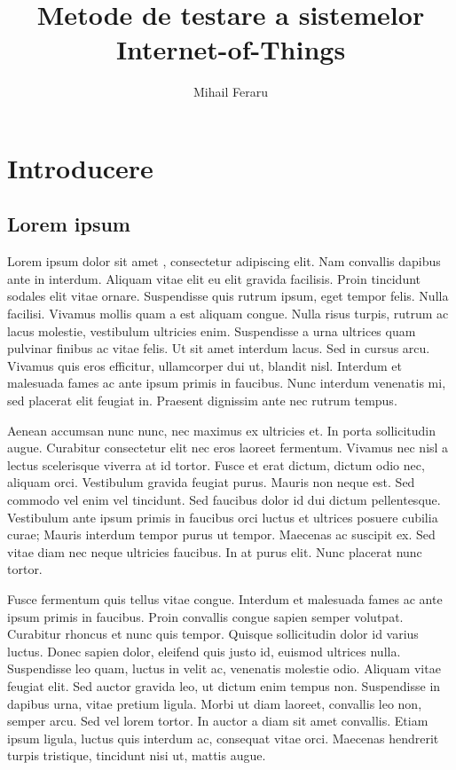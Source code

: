 \documentclass{report}[12pt, a4paper]
\title{Metode de testare a sistemelor Internet-of-Things}
\author{Mihail Feraru}
\begin{document}
\cleardoublepage
\pagestyle{front}
\let\ps@plain\ps@front



\restoregeometry

\addtocounter{page}{1}



\tableofcontents

\cleardoublepage
\pagestyle{main}
\let\ps@plain\ps@main

\chapter{Introducere}

\section{Lorem ipsum}

Lorem ipsum dolor sit amet \cite{fake_citation}, consectetur adipiscing elit. Nam convallis dapibus ante in interdum. Aliquam vitae elit eu elit gravida facilisis. Proin tincidunt sodales elit vitae ornare. Suspendisse quis rutrum ipsum, eget tempor felis. Nulla facilisi. Vivamus mollis quam a est aliquam congue. Nulla risus turpis, rutrum ac lacus molestie, vestibulum ultricies enim. Suspendisse a urna ultrices quam pulvinar finibus ac vitae felis. Ut sit amet interdum lacus. Sed in cursus arcu. Vivamus quis eros efficitur, ullamcorper dui ut, blandit nisl. Interdum et malesuada fames ac ante ipsum primis in faucibus. Nunc interdum venenatis mi, sed placerat elit feugiat in. Praesent dignissim ante nec rutrum tempus.

Aenean accumsan nunc nunc, nec maximus ex ultricies et. In porta sollicitudin augue. Curabitur consectetur elit nec eros laoreet fermentum. Vivamus nec nisl a lectus scelerisque viverra at id tortor. Fusce et erat dictum, dictum odio nec, aliquam orci. Vestibulum gravida feugiat purus. Mauris non neque est. Sed commodo vel enim vel tincidunt. Sed faucibus dolor id dui dictum pellentesque. Vestibulum ante ipsum primis in faucibus orci luctus et ultrices posuere cubilia curae; Mauris interdum tempor purus ut tempor. Maecenas ac suscipit ex. Sed vitae diam nec neque ultricies faucibus. In at purus elit. Nunc placerat nunc tortor.

Fusce fermentum quis tellus vitae congue. Interdum et malesuada fames ac ante ipsum primis in faucibus. Proin convallis congue sapien semper volutpat. Curabitur rhoncus et nunc quis tempor. Quisque sollicitudin dolor id varius luctus. Donec sapien dolor, eleifend quis justo id, euismod ultrices nulla. Suspendisse leo quam, luctus in velit ac, venenatis molestie odio. Aliquam vitae feugiat elit. Sed auctor gravida leo, ut dictum enim tempus non. Suspendisse in dapibus urna, vitae pretium ligula. Morbi ut diam laoreet, convallis leo non, semper arcu. Sed vel lorem tortor. In auctor a diam sit amet convallis. Etiam ipsum ligula, luctus quis interdum ac, consequat vitae orci. Maecenas hendrerit turpis tristique, tincidunt nisi ut, mattis augue.


\printbibliography[heading=bibintoc]
\end{document}

